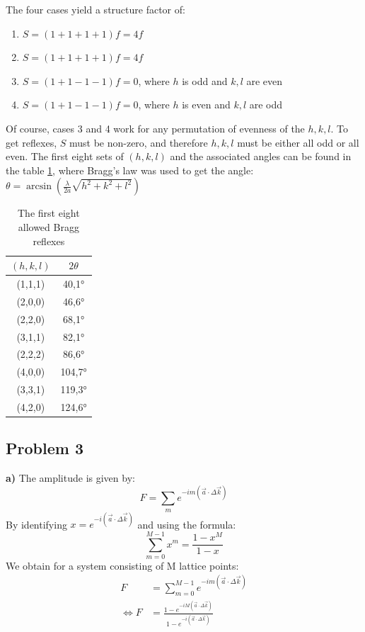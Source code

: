 \documentclass[12pt]{article}
\begin{document}
The four cases yield a structure factor of:
\begin{enumerate}
    \item $S = (1+1+1+1) f = 4f$
    \item $S = (1+1+1+1) f = 4f$
    \item $S = (1+1-1-1) f = 0$, where $h$ is odd and $k,l$ are even 
    \item $S = (1+1-1-1) f = 0$, where $h$ is even and $k,l$ are odd
\end{enumerate} 
Of course, cases 3 and 4 work for any permutation of evenness of the $h,k,l$. To get reflexes, $S$ must be non-zero, and therefore $h,k,l$ must be either all odd or all even. The first eight sets of $(h,k,l)$ and the associated angles can be found in the table \ref{tab:allowedBraggReflexes}, where Bragg's law was used to get the angle: $\theta = \arcsin{\left(\frac{\lambda}{2a}\sqrt{h^2+k^2+l^2}\right)}$
\begin{table}[!ht]
    \centering
    \begin{tabular}{c|c}
        $(h,k,l)$ & $2\theta$ \\ \hline
        (1,1,1) & 40,1° \\
        (2,0,0) & 46,6° \\
        (2,2,0) & 68,1° \\
        (3,1,1) & 82,1° \\
        (2,2,2) & 86,6° \\
        (4,0,0) & 104,7° \\
        (3,3,1) & 119,3° \\
        (4,2,0) & 124,6° \\
    \end{tabular}
    \caption{The first eight allowed Bragg reflexes}
    \label{tab:allowedBraggReflexes}
\end{table}
\subsection{Problem 3}

\textbf{a)} The amplitude is given by:
\begin{equation}
    F = \sum_m e^{-im(\Vec{a} \cdot \Delta \Vec{k})}
\end{equation}
By identifying $x = e^{-i(\Vec{a} \cdot \Delta \Vec{k})}$ and using the formula: 
\begin{equation}
    \sum_{m=0}^{M-1}x^m = \frac{1-x^M}{1-x}
\end{equation}
We obtain for a system consisting of M lattice points:
\begin{align}
    F &= \sum_{m=0}^{M-1} e^{-im(\Vec{a} \cdot \Delta \Vec{k})} \\ 
    \Leftrightarrow F &= \frac{1-e^{-iM(\Vec{a} \cdot \Delta \Vec{k})}}{1-e^{-i(\Vec{a} \cdot \Delta \Vec{k})}}
\end{align}
\end{document}
